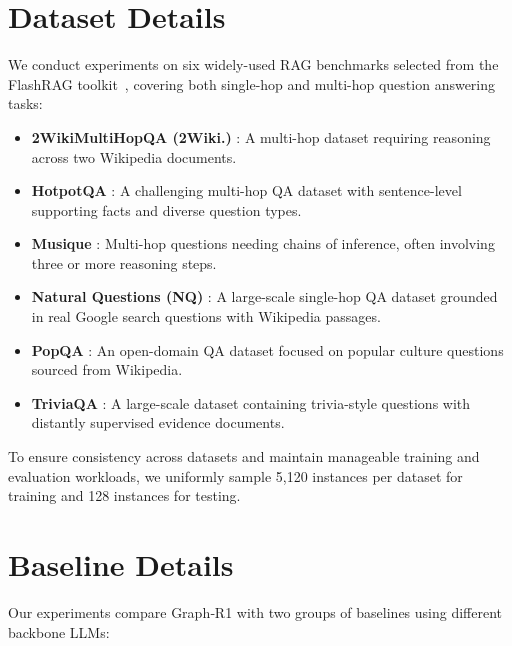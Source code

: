\documentclass{article}
\theoremstyle{plain}
\theoremstyle{definition}
\theoremstyle{remark}
\begin{document}
\section{Dataset Details}
\label{Dataset}
We conduct experiments on six widely-used RAG benchmarks selected from the FlashRAG toolkit~\citep{FlashRAG}, covering both single-hop and multi-hop question answering tasks:
\vspace{-1mm}
\begin{itemize}[leftmargin=*]
  \item \textbf{2WikiMultiHopQA (2Wiki.)} \citep{2WikiMultiHopQA}: A multi-hop dataset requiring reasoning across two Wikipedia documents.
  \item \textbf{HotpotQA} \citep{HotpotQA}: A challenging multi-hop QA dataset with sentence-level supporting facts and diverse question types.
  \item \textbf{Musique} \citep{Musique}: Multi-hop questions needing chains of inference, often involving three or more reasoning steps.
  \item \textbf{Natural Questions (NQ)} \citep{NQ}: A large-scale single-hop QA dataset grounded in real Google search questions with Wikipedia passages.
  \item \textbf{PopQA} \citep{PopQA}: An open-domain QA dataset focused on popular culture questions sourced from Wikipedia.
  \item \textbf{TriviaQA} \citep{TriviaQA}: A large-scale dataset containing trivia-style questions with distantly supervised evidence documents.
\end{itemize}
\vspace{-1mm}
To ensure consistency across datasets and maintain manageable training and evaluation workloads, we uniformly sample 5,120 instances per dataset for training and 128 instances for testing.

\section{Baseline Details}
\label{Baseline}
Our experiments compare Graph‑R1 with two groups of baselines using different backbone LLMs:
\vspace{-1.5mm}
\end{document}

